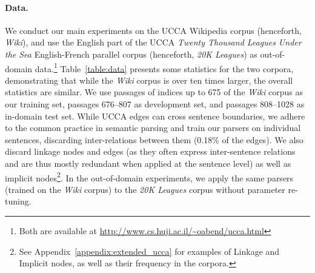 \documentclass[11pt,a4paper]{article}
\newcommand{\tabref}[1]{Table~\ref{#1}}
\begin{document}
\paragraph{Data.}
We conduct our main experiments on the UCCA Wikipedia corpus (henceforth, \textit{Wiki}),
and use the English part of the UCCA \textit{Twenty Thousand Leagues Under the Sea} English-French parallel corpus (henceforth, \textit{20K Leagues}) as
out-of-domain data.\footnote{Both are available at \url{http://www.cs.huji.ac.il/~oabend/ucca.html}}
\tabref{table:data} presents some statistics for the two corpora, demonstrating that while
the \textit{Wiki} corpus is over ten times larger, the overall statistics are
similar.
We use passages of indices up to 675
of the \textit{Wiki} corpus as our training set, passages 676--807 as development set,
and passages 808--1028 as in-domain test set.
While UCCA edges can cross sentence boundaries, we adhere to the common
practice in semantic parsing and train our parsers on individual sentences,
discarding inter-relations between them (0.18\% of the edges).
We also discard linkage nodes and edges (as they often express inter-sentence
relations and are thus mostly redundant when applied at the sentence level)
as well as implicit nodes\footnote{See Appendix~\ref{appendix:extended_ucca} for examples
of Linkage and Implicit nodes, as well as their frequency in the corpora.}.
In the out-of-domain experiments, we apply the same parsers
(trained on the \textit{Wiki} corpus) to the \textit{20K Leagues} corpus
without parameter re-tuning.


\begin{table}
\caption{Statistics of the \textit{Wiki} and \textit{20K Leagues} UCCA corpora.
All counts exclude the root node, implicit nodes, and linkage nodes and edges.
}
\label{table:data}
\end{table}
\end{document}
